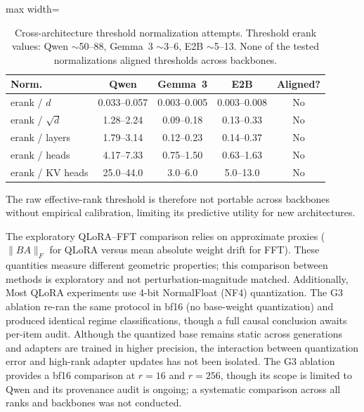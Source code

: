 \documentclass[a4paper,fleqn]{cas-dc}
\newif\ifshowchanges
\newcommand{\rev}[1]{\ifshowchanges{\color{blue}#1}\else{#1}\fi}
\renewcommand{\arraystretch}{1.8}
\begin{document}
\begin{table}[tp]
\caption{Cross-architecture threshold normalization attempts. Threshold erank
values: Qwen ${\sim}$50--88, Gemma~3 ${\sim}$3--6, E2B ${\sim}$5--13. None of
the tested normalizations aligned thresholds across
backbones.}\label{tab:normalization}
\footnotesize
\renewcommand{\arraystretch}{1.4}
\begin{adjustbox}{max width=\columnwidth}
\begin{tabular}{@{}lcccc@{}}
\toprule
\textbf{Norm.} & \textbf{Qwen} & \textbf{Gemma~3} & \textbf{E2B} & \textbf{Aligned?} \\
\midrule
erank / $d$        & 0.033--0.057 & 0.003--0.005 & 0.003--0.008 & No \\
\addlinespace
erank / $\sqrt{d}$ & 1.28--2.24   & 0.09--0.18   & 0.13--0.33   & No \\
\addlinespace
erank / layers     & 1.79--3.14   & 0.12--0.23   & 0.14--0.37   & No \\
\addlinespace
erank / heads      & 4.17--7.33   & 0.75--1.50   & 0.63--1.63   & No \\
\addlinespace
erank / KV heads   & 25.0--44.0   & 3.0--6.0     & 5.0--13.0    & No \\
\bottomrule
\end{tabular}
\end{adjustbox}
\end{table}

\noindent The raw effective-rank threshold is
therefore not portable across backbones without empirical calibration, limiting
its predictive utility for new architectures.

\rev{The exploratory QLoRA--FFT comparison} relies on approximate
proxies ($\|BA\|_F$ for QLoRA versus mean absolute weight drift for FFT). These
\rev{quantities measure different geometric properties; this comparison between methods is exploratory and not perturbation-magnitude matched.} Additionally,
\rev{Most QLoRA experiments use 4-bit NormalFloat (NF4) quantization. The G3 ablation re-ran the same protocol in bf16 (no base-weight quantization) and produced identical regime classifications, though a full causal conclusion awaits per-item audit. Although}
the quantized base remains static across generations and adapters are trained in
higher precision, the interaction between quantization error and high-rank
adapter updates has not been isolated. \rev{The G3 ablation provides a bf16 comparison at $r=16$ and $r=256$, though its scope is limited to Qwen and its provenance audit is ongoing; a systematic comparison across all ranks and backbones was not conducted.}
\end{document}
